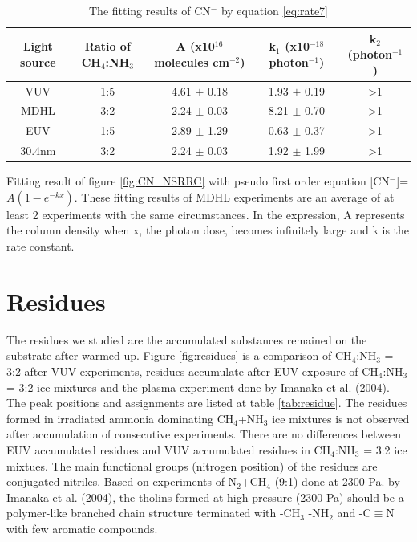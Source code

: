 \begin{table}[htbp]
\caption{The fitting results of CN$^-$ by equation \ref{eq:rate7}}
\label{tab:CNrate_NSRRC}
\begin{tabular}{ccccc}
\hline
\hline
Light source & Ratio of CH$_4$:NH$_3$ & A (x10$^{16}$ molecules cm$^{-2}$) & k$_1$ (x10$^{-18}$ photon$^{-1}$) & k$_2$ (photon$^{-1}$)\\
\hline
VUV & 1:5 & 4.61 $\pm$ 0.18 & 1.93 $\pm$ 0.19 & >1 \\
MDHL & 3:2 & 2.24 $\pm$ 0.03 & 8.21 $\pm$ 0.70 & >1 \\
\hline
EUV & 1:5 & 2.89 $\pm$ 1.29 & 0.63 $\pm$ 0.37 & >1 \\
 30.4nm & 3:2 & 2.24 $\pm$ 0.03 & 1.92 $\pm$ 1.99 & >1 \\
\hline
\end{tabular}
Fitting result of figure \ref{fig:CN_NSRRC} with pseudo first order equation [CN$^-$]=$A(1-e^{-kx})$. These fitting results of MDHL experiments are an average of at least 2 experiments with the same circumstances. In the expression, A represents the column density when x, the photon dose, becomes infinitely large and k is the rate constant.\
\end{table}


\section{Residues}

The residues we studied are the accumulated substances remained on the substrate after warmed up. Figure \ref{fig:residues} is a comparison of CH$_4$:NH$_3$ = 3:2 after VUV experiments, residues accumulate after EUV exposure of CH$_4$:NH$_3$ = 3:2 ice mixtures and the plasma experiment done by Imanaka et al. (2004)\cite{imanaka2004laboratory}. The peak positions and assignments are listed at table \ref{tab:residue}. The residues formed in irradiated ammonia dominating CH$_4$+NH$_3$ ice mixtures is not observed after accumulation of consecutive experiments. There are no differences between EUV accumulated residues and VUV accumulated residues in CH$_4$:NH$_3$ = 3:2 ice mixtues. The main functional groups (nitrogen position) of the residues are conjugated nitriles. Based on experiments of N$_2$+CH$_4$ (9:1) done at 2300 Pa. by Imanaka et al. (2004)\cite{imanaka2004laboratory}, the tholins formed at high pressure (2300 Pa) should be a polymer-like branched chain structure terminated with -CH$_3$ -NH$_2$ and -C$\equiv$N with few aromatic compounds.\\

